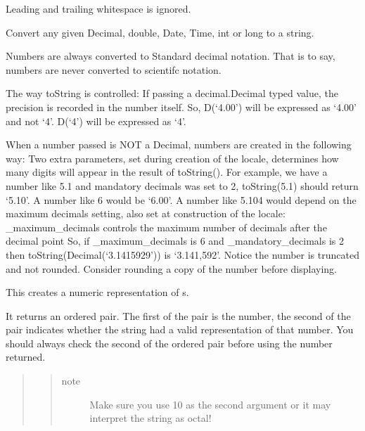 \documentclass[letterpaper,10pt,english]{sphinxmanual}
\begin{document}
\begin{fulllineitems}
\begin{fulllineitems}
Leading and trailing whitespace is ignored.

\end{fulllineitems}


\begin{fulllineitems}
\label{index:qsdn.QSDNLocale.toString}
Convert any given Decimal, double, Date, Time, int or long to a string.

Numbers are always converted to Standard decimal notation.  That is to say,
numbers are never converted to scientifc notation.

The way toString is controlled:
If passing a decimal.Decimal typed value, the precision is recorded in the 
number itself.  So, D(`4.00') will be expressed as `4.00' and not `4'.
D(`4') will be expressed as `4'.

When a number passed is NOT a Decimal, numbers are created in the following way:
Two extra parameters, set during creation of the locale, determines how 
many digits will appear in the result of toString().
For example, we have a number like 5.1 and mandatory decimals was set    
to 2, toString(5.1) should return `5.10'.  A number like 6 would be `6.00'.
A number like 5.104 would depend on the maximum decimals setting, also 
set at construction of the locale:
\_maximum\_decimals controls the maximum number of decimals after the decimal point
So, if \_maximum\_decimals is 6 and \_mandatory\_decimals is 2 then 
toString(Decimal(`3.1415929')) is `3.141,592'.
Notice the number is truncated and not rounded.  
Consider rounding a copy of the number before displaying.

\end{fulllineitems}


\begin{fulllineitems}
\label{index:qsdn.QSDNLocale.toUInt}
This creates a numeric representation of s.

It returns an ordered pair.  The first of the pair is the number, the second of the pair indicates whether the string had a valid representation of that number.  You should always check the second of the ordered pair before using the number returned.
\begin{quote}
\begin{quote}\begin{description}
\item[{note}] \leavevmode
Make sure you use 10 as the second argument or it may interpret the string as octal!


\end{description}
\end{quote}
\end{quote}
\end{fulllineitems}
\end{fulllineitems}
\end{document}
